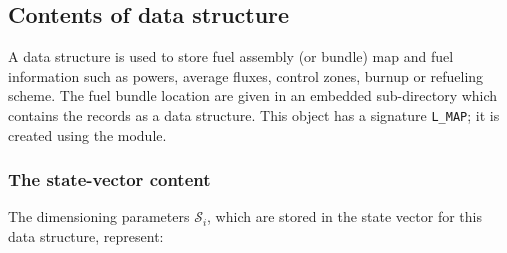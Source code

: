 \subsection{Contents of  data structure}\label{sect:resinidat}

\vskip 0.2cm
A  data structure is used to store fuel assembly (or bundle) map and 
fuel information such as powers, average fluxes, control zones, burnup
or refueling scheme. The fuel bundle location are given in an
embedded sub-directory which contains the records as a 
data structure. This object has a signature {\tt L\_MAP};
it is created using the  module.

\subsubsection{The state-vector content}\label{sect:fmapstate}

\noindent
The dimensioning parameters $\mathcal{S}_i$, which are stored in the state
vector for this data structure, represent:

